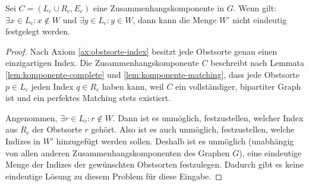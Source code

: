\begin{lemma}\label{lem:komponente-one-not-wunschliste}
Sei $C = (L_c \cup R_c, E_c)$ eine Zusammenhangskomponente in $G$.
Wenn gilt: $\exists x \in L_c : x \notin W$ und $\exists y \in L_c : y \in W$,
dann kann die Menge $W'$ nicht eindeutig
festgelegt werden.
\end{lemma}
\begin{proof}
Nach Axiom \ref{ax:obstsorte-index} besitzt jede Obstsorte genau einen einzigartigen Index.
Die Zusammenhangskomponente $C$ beschreibt nach Lemmata \ref{lem:komponente-complete} und \ref{lem:komponente-matching},
dass jede Obstsorte $p \in L_c$ jeden Index $q \in R_c$ haben kann, weil $C$ ein vollständiger, bipartiter Graph ist und ein perfektes Matching stets existiert.

Angenommen, $\exists r \in L_c : r \notin W$. Dann ist es unmöglich, festzustellen,
welcher Index aus $R_c$ der Obstsorte $r$ gehört.
Also ist es auch unmöglich, festzustellen, welche Indizes in $W'$ hinzugefügt werden sollen.
Deshalb
ist es unmöglich (unabhängig von allen anderen Zusammenhangskomponenten des Graphen $G$),
eine eindeutige Menge der Indizes der gewünschten Obstsorten festzulegen.
Dadurch gibt es keine eindeutige Lösung zu diesem Problem für diese Eingabe.
\end{proof}
